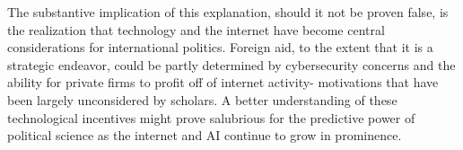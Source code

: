 The substantive implication of this explanation, should it not be proven false, is the realization that technology and the internet have become central considerations for international politics. Foreign aid, to the extent that it is a strategic endeavor, could be partly determined by cybersecurity concerns and the ability for private firms to profit off of internet activity- motivations that have been largely unconsidered by scholars. A better understanding of these technological incentives might prove salubrious for the predictive power of political science as the internet and AI continue to grow in prominence.